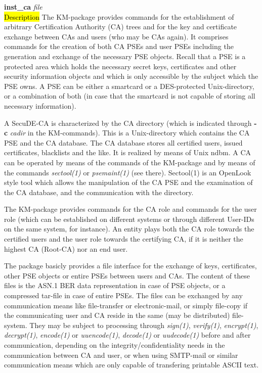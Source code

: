 {\bf inst\_ca} {\em file} \\
\hl{Description}
The KM-package provides commands for the establishment of arbitrary Certification Authority (CA) trees 
and for the key and certificate exchange between CAs and users (who may be CAs again). 
It comprises commands for the creation of both CA PSEs and user PSEs
including the generation and exchange of the necessary PSE objects. Recall that a PSE is
a protected area which holds the necessary secret keys, certificates and other security
information objects and which is only accessible by the subject which the PSE owns. A PSE
can be either a smartcard or a DES-protected Unix-directory, or a combination of both (in
case that the smartcard is not capable of storing all necessary information).

A  SecuDE-CA is characterized by the CA directory (which is indicated through {\bf -c} {\em cadir} 
in the KM-commands).
This is a Unix-directory which contains the CA PSE and the CA database. The CA database
stores all certified users, issued certificates, blacklists and the like. It is realized by means of 
Unix ndbm. A CA can be operated by means of the commands of the KM-package and by means of the 
commands {\em sectool(1)} or {\em psemaint(1)} (see there). Sectool(1) is an OpenLook style 
tool which allows the manipulation of the CA PSE and the examination of the CA database, and 
the communication with the directory.

The KM-package provides commands for the CA role and commands for the user role (which can be 
established 
on different systems or through different User-IDs on the same system, for instance). 
An entity plays both the CA role towards the certified users and the user role towards the certifying
CA, if it is neither the highest CA (Root-CA) nor an end user.

The package basicly provides a file interface for the exchange of keys, certificates, other
PSE objects or entire PSEs between users and CAs. The content of these files is the ASN.1 BER data 
representation in case of PSE objects, or a compressed tar-file in case of entire PSEs. The files
can be exchanged by any communication means like file-transfer or electronic-mail, or                
simply file-copy if the communicating user and CA reside in the same (may be distributed)
file-system. They may be subject to processing through {\em sign(1)}, {\em verify(1)}, {\em encrypt(1)},
{\em decrypt(1)}, {\em encode(1)} or {\em uuencode(1)}, {\em decode(1)} or {\em uudecode(1)}
before and after communication, depending on the integrity/confidentiality needs in the
communication between CA and user, or when using SMTP-mail or similar communication means 
which are only capable of transfering printable ASCII text.

